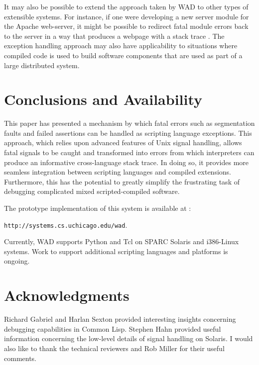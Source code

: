 It may also be possible to extend the approach taken by WAD to other
types of extensible systems.  For instance, if one were developing a
new server module for the Apache web-server, it might be possible to redirect fatal
module errors back to the server in a way that produces a webpage with
a stack trace \cite{apache}.  The exception handling approach may also have
applicability to situations where compiled code is used to build software
components that are used as part of a large distributed system.

\section{Conclusions and Availability}

This paper has presented a mechanism by which fatal errors such as
segmentation faults and failed assertions can be handled as scripting
language exceptions.  This approach, which relies upon advanced
features of Unix signal handling, allows fatal signals to be caught
and transformed into errors from which interpreters can produce an
informative cross-language stack trace. In doing so, it provides more
seamless integration between scripting languages and compiled
extensions.  Furthermore, this has the potential to greatly simplify the
frustrating task of debugging complicated mixed scripted-compiled
software.

The prototype implementation of this system is available at :

\begin{center}
{\tt http://systems.cs.uchicago.edu/wad}.
\end{center}

\noindent
Currently, WAD supports Python and Tcl on SPARC Solaris and i386-Linux
systems.  Work to support additional scripting languages and platforms
is ongoing.

\section{Acknowledgments}

Richard Gabriel and Harlan Sexton provided interesting insights
concerning debugging capabilities in Common Lisp.  Stephen Hahn
provided useful information concerning the low-level details of signal
handling on Solaris.  I would also like to thank the technical
reviewers and Rob Miller for their useful comments.

